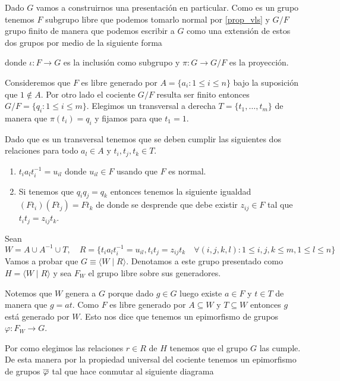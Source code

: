 \documentclass[tesis.tex]{subfiles}
\begin{document}
\begin{obs}\label{obs_presentacion_vl}
	Dado $G$ \vl vamos a construirnos una presentación en particular.
	Como es un grupo \vl tenemos $F$ subgrupo libre que podemos tomarlo normal por \ref{prop_vls} y $G/F$ grupo finito de manera que podemos escribir a $G$ como una extensión de estos dos grupos por medio de la siguiente forma
	\begin{center}
	\end{center}
	donde $\iota: F \to G$ es la inclusión como subgrupo y $\pi: G \to G/F$ es la proyección.

	
	Consideremos que $F$ es libre generado por $A = \{ a_i : 1 \le i \le n \}$ bajo la suposición que $1 \notin A$.
	Por otro lado el cociente $G/F$ resulta ser finito entonces $G/F = \{ q_i : 1 \le i \le m \}$.
	Elegimos un transversal a derecha $T = \{ t_1, \dots, t_m \}$ de manera que $\pi(t_i)= q_i$ y fijamos para que $t_1 = 1$.
	
	Dado que es un transversal tenemos que se deben cumplir las siguientes dos relaciones para todo $a_l \in A$ y $t_i,t_j,t_k \in T$. 
	\begin{enumerate}
		\item $t_ia_{l}t_i^{-1} = u_{il}$ donde $u_{il} \in F$ usando que $F$ es normal.
		\item Si tenemos que $q_iq_j = q_k$ entonces tenemos la siguiente igualdad 
		$(Ft_{i}) (Ft_{j}) = Ft_{k}$
		de donde se desprende que debe existir $z_{ij} \in F$ tal que 
		 $t_it_j = z_{ij}t_k$.
	\end{enumerate}
	Sean
	\[
		W = A \cup A^{-1} \cup T, \quad R = \{t_ia_{l}t_i^{-1} = u_{il},  t_it_j = z_{ij}t_k \quad \forall (i,j,k,l) :   1 \le i,j,k \le m, 1 \le l  \le n \}
	\]
	Vamos a probar que $G \equiv \langle W \mid R \rangle$. 
	Denotamos a este grupo presentado como $H = \langle W \mid R \rangle$ y sea $F_{W}$ el grupo libre sobre sus generadores.
	
	Notemos que $W$ genera a $G$ porque
	dado $g \in G$ luego existe $a \in F$ y $t \in T$ de manera que $g = at$.
	Como $F$ es libre generado por $A \subseteq W$ y $T \subseteq W$ entonces $g$ está generado por $W$. 
	Esto nos dice que tenemos un epimorfismo de grupos $\varphi: F_{W} \to G$.
	
	Por como elegimos las relaciones $r \in R$ de $H$ tenemos que el grupo $G$ las cumple.
	De esta manera por la propiedad universal del cociente tenemos un epimorfismo de grupos $\overline \varphi$ tal que hace conmutar al siguiente diagrama	
	\begin{center}
	\end{center}
	

\end{obs}
\end{document}
